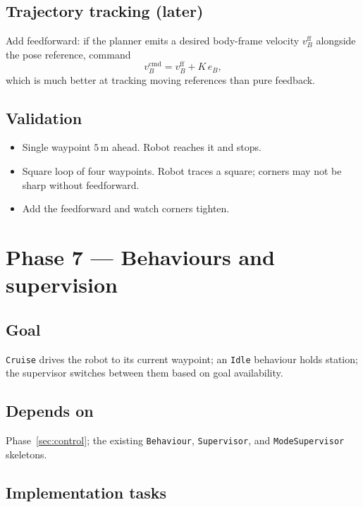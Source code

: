 \documentclass[11pt,a4paper]{article}
\newcommand{\code}[1]{\texttt{\small #1}}
\begin{document}
\subsection*{Trajectory tracking (later)}

Add feedforward: if the planner emits a desired body-frame velocity
$v_B^{\text{ff}}$ alongside the pose reference, command
\begin{equation}
    v_B^{\text{cmd}} = v_B^{\text{ff}} + K\, e_B,
\end{equation}
which is much better at tracking moving references than pure feedback.

\subsection*{Validation}

\begin{itemize}
    \item Single waypoint $5\,\text{m}$ ahead. Robot reaches it and stops.
    \item Square loop of four waypoints. Robot traces a square; corners
        may not be sharp without feedforward.
    \item Add the feedforward and watch corners tighten.
\end{itemize}

\section{Phase 7 --- Behaviours and supervision}
\label{sec:behaviours}

\subsection*{Goal}
\code{Cruise} drives the robot to its current waypoint; an \code{Idle}
behaviour holds station; the supervisor switches between them based on
goal availability.

\subsection*{Depends on}
Phase~\ref{sec:control}; the existing \code{Behaviour}, \code{Supervisor},
and \code{ModeSupervisor} skeletons.

\subsection*{Implementation tasks}
\end{document}
